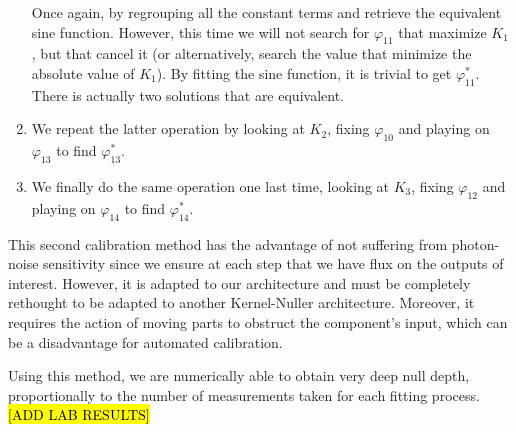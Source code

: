 \documentclass{aa}
\begin{document}
\begin{enumerate}
                    Once again, by regrouping all the constant terms and retrieve the equivalent sine function. However, this time we will not search for $\varphi_{11}$ that maximize $K_1$, but that cancel it (or alternatively, search the value that minimize the absolute value of $K_1$). By fitting the sine function, it is trivial to get $\varphi^*_{11}$. There is actually two solutions that are equivalent.

                    \item We repeat the latter operation by looking at $K_2$, fixing $\varphi_{10}$ and playing on $\varphi_{13}$ to find $\varphi^*_{13}$.

                    \item We finally do the same operation one last time, looking at $K_3$, fixing $\varphi_{12}$ and playing on $\varphi_{14}$ to find $\varphi^*_{14}$.
                
            \end{enumerate}
    
            This second calibration method has the advantage of not suffering from photon-noise sensitivity since we ensure at each step that we have flux on the outputs of interest. However, it is adapted to our architecture and must be completely rethought to be adapted to another Kernel-Nuller architecture. Moreover, it requires the action of moving parts to obstruct the component's input, which can be a disadvantage for automated calibration.
    
            Using this method, we are numerically able to obtain very deep null depth, proportionally to the number of measurements taken for each fitting process. \hl{[ADD LAB RESULTS]}
    
\end{document}
